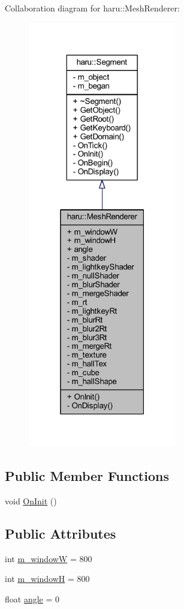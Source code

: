Collaboration diagram for haru\+:\+:Mesh\+Renderer\+:\nopagebreak
\begin{figure}[H]
\begin{center}
\leavevmode
\includegraphics[width=184pt]{classharu_1_1_mesh_renderer__coll__graph}
\end{center}
\end{figure}
\subsection*{Public Member Functions}
\begin{DoxyCompactItemize}
\item 
void \mbox{\hyperlink{classharu_1_1_mesh_renderer_a5a6a5b945fc7560d166e9d16058aec53}{On\+Init}} ()
\end{DoxyCompactItemize}
\subsection*{Public Attributes}
\begin{DoxyCompactItemize}
\item 
int \mbox{\hyperlink{classharu_1_1_mesh_renderer_a30ea5ddf109ff42564c5eecfb73d4b4f}{m\+\_\+windowW}} = 800
\item 
int \mbox{\hyperlink{classharu_1_1_mesh_renderer_a17e10695dd67e9094bd28c110231082c}{m\+\_\+windowH}} = 800
\item 
float \mbox{\hyperlink{classharu_1_1_mesh_renderer_ad1881dc8b63b1824fadc85436624241c}{angle}} = 0
\end{DoxyCompactItemize}
